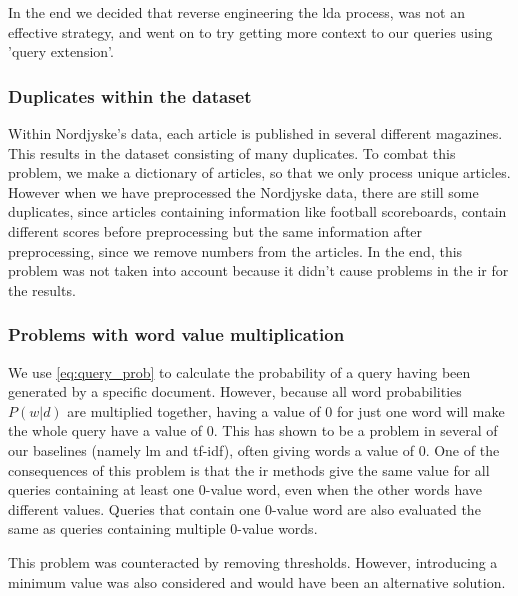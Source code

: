 In the end we decided that reverse engineering the \gls{lda} process, was not an effective strategy, and went on to try getting more context to our queries using 'query extension'.


\subsubsection{Duplicates within the dataset}
Within Nordjyske's data, each article is published in several different magazines. 
This results in the dataset consisting of many duplicates. 
To combat this problem, we make a dictionary of articles, so that we only process unique articles.
However when we have preprocessed the Nordjyske data, there are still some duplicates, since articles containing information like football scoreboards, contain different scores before preprocessing but the same information after preprocessing, since we remove numbers from the articles.
In the end, this problem was not taken into account because it didn't cause problems in the \gls{ir} for the results.


\subsubsection{Problems with word value multiplication}
We use \autoref{eq:query_prob} to calculate the probability of a query having been generated by a specific document. 
However, because all word probabilities $P(w|d)$ are multiplied together, having a value of 0 for just one word will make the whole query have a value of 0.
This has shown to be a problem in several of our baselines (namely \gls{lm} and \gls{tf-idf}), often giving words a value of 0.
One of the consequences of this problem is that the \gls{ir} methods give the same value for all queries containing at least one 0-value word, even when the other words have different values. 
Queries that contain one 0-value word are also evaluated the same as queries containing multiple 0-value words.

This problem was counteracted by removing thresholds.
However, introducing a minimum value was also considered and would have been an alternative solution.
